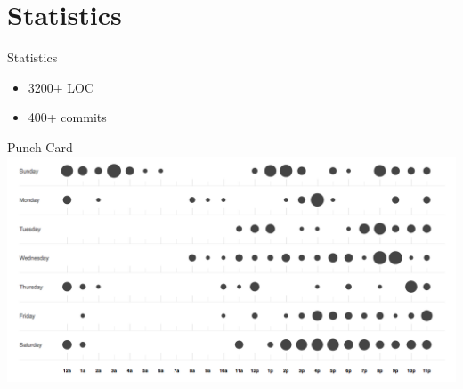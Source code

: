 \section{Statistics}

\begin{frame}{Statistics}
\begin{itemize}
	\item 3200+ LOC
	\item 400+ commits
\end{itemize}
\end{frame}

\begin{frame}{Punch Card}
	\includegraphics[width=\textwidth]{./resources/punchcard.png}
\end{frame}
